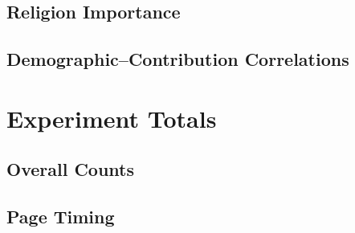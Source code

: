 \documentclass[11pt, landscape]{article}
\begin{document}
\subsection{Religion Importance}


\subsection{Demographic--Contribution Correlations}


\newpage

\section{Experiment Totals}

\subsection{Overall Counts}


\subsection{Page Timing}

\end{document}
